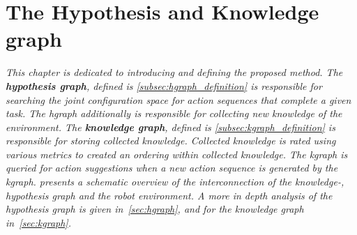 \chapter{The Hypothesis and Knowledge graph}%
\label{chap:hgraph_and_kgraph}

\textit{This chapter is dedicated to introducing and defining the proposed method. The \textbf{hypothesis graph}, defined is \cref{subsec:hgraph_definition} is responsible for searching the joint configuration space for action sequences that complete a given task. The \ac{hgraph} additionally is responsible for collecting new knowledge of the environment. The \textbf{knowledge graph}, defined is \cref{subsec:kgraph_definition} is responsible for storing collected knowledge. Collected knowledge is rated using various metrics to created an ordering within collected knowledge. The \ac{kgraph} is queried for action suggestions when a new action sequence is generated by the \ac{kgraph}.  presents a schematic overview of the interconnection of the knowledge-, hypothesis graph and the robot environment. A more in depth analysis of the hypothesis graph is given in~\cref{sec:hgraph}, and for the knowledge graph in~\cref{sec:kgraph}.}

